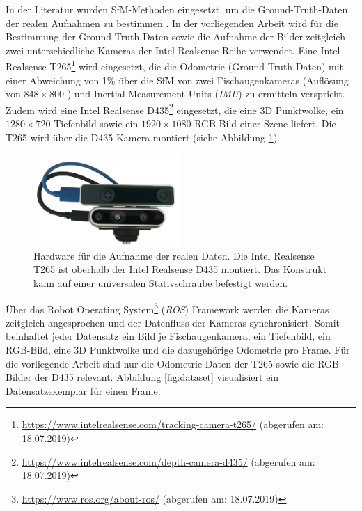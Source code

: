 In der Literatur wurden SfM-Methoden eingesetzt, um die Ground-Truth-Daten der realen Aufnahmen zu bestimmen \cite{kendallPoseNetConvolutionalNetwork2015, clarkVidLocDeepSpatioTemporal2017, acharyaBIMPoseNetIndoorCamera2019}. 
In der vorliegenden Arbeit wird für die Bestimmung der Ground-Truth-Daten sowie die Aufnahme der Bilder zeitgleich zwei unterschiedliche Kameras der Intel Realsense Reihe verwendet. Eine Intel Realsense T265\footnote{\url{https://www.intelrealsense.com/tracking-camera-t265/} (abgerufen am: 18.07.2019)} wird eingesetzt, die die Odometrie (Ground-Truth-Daten) mit einer Abweichung von 1\%  über die SfM von zwei Fischaugenkameras (Auflösung von $848 \times 800$ ) und Inertial Measurement Units (\textit{IMU}) zu ermitteln verspricht. Zudem wird eine Intel Realsense D435\footnote{ \url{https://www.intelrealsense.com/depth-camera-d435/} (abgerufen am: 18.07.2019)} eingesetzt, die eine 3D Punktwolke, ein $1280\times720$ Tiefenbild sowie ein $1920\times1080$ RGB-Bild einer Szene liefert. Die T265 wird über die D435 Kamera montiert (siehe Abbildung \ref{fig:t265_d435}).

\begin{figure}[H]
	\centering
	\includegraphics[width=0.5\textwidth]{images/real_dataset/t265_d435_2.png}
	\caption{Hardware für die Aufnahme der realen Daten. Die Intel Realsense T265 ist oberhalb der Intel Realsense D435 montiert. Das Konstrukt kann auf einer universalen Stativschraube befestigt werden.  }
	\label{fig:t265_d435}
\end{figure}

Über das Robot Operating System\footnote{\url{https://www.ros.org/about-ros/} (abgerufen am: 18.07.2019)} (\textit{ROS}) Framework werden die Kameras zeitgleich angesprochen und der Datenfluss der Kameras synchronisiert. Somit beinhaltet jeder Datensatz ein Bild je Fischaugenkamera, ein Tiefenbild, ein RGB-Bild, eine 3D Punktwolke und die dazugehörige Odometrie pro Frame. Für die vorliegende Arbeit sind nur die Odometrie-Daten der T265 sowie die RGB-Bilder der D435 relevant. Abbildung \ref{fig:dataset} visualisiert ein Datensatzexemplar für einen Frame.

